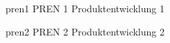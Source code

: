 \newacronym
  {pren1}                %
  {PREN 1}                %
  {Produktentwicklung 1}  %

\newacronym
  {pren2}                %
  {PREN 2}                %
  {Produktentwicklung 2}  %
